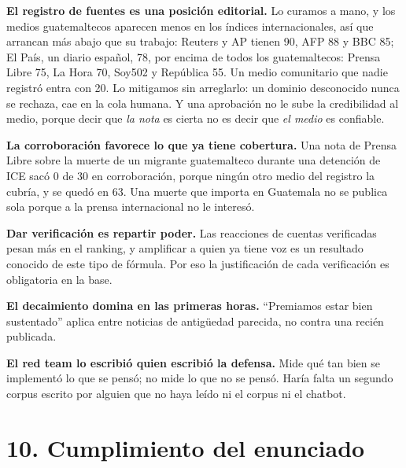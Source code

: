 \documentclass[12pt,a4paper]{article}
\begin{document}
\textbf{El registro de fuentes es una posición editorial.} Lo curamos a mano, y los medios
guatemaltecos aparecen menos en los índices internacionales, así que arrancan más abajo que su
trabajo: Reuters y AP tienen 90, AFP 88 y BBC 85; El País, un diario español, 78, por encima de
todos los guatemaltecos: Prensa Libre 75, La Hora 70, Soy502 y República 55. Un medio comunitario
que nadie registró entra con 20. Lo mitigamos sin arreglarlo: un dominio desconocido nunca se
rechaza, cae en la cola humana. Y una aprobación no le sube la credibilidad al medio, porque decir
que \emph{la nota} es cierta no es decir que \emph{el medio} es confiable.

\textbf{La corroboración favorece lo que ya tiene cobertura.} Una nota de Prensa Libre sobre la
muerte de un migrante guatemalteco durante una detención de ICE sacó 0 de 30 en corroboración,
porque ningún otro medio del registro la cubría, y se quedó en 63. Una muerte que importa en
Guatemala no se publica sola porque a la prensa internacional no le interesó.

\textbf{Dar verificación es repartir poder.} Las reacciones de cuentas verificadas pesan más en el
ranking, y amplificar a quien ya tiene voz es un resultado conocido de este tipo de fórmula. Por eso
la justificación de cada verificación es obligatoria en la base.

\textbf{El decaimiento domina en las primeras horas.} ``Premiamos estar bien sustentado'' aplica
entre noticias de antigüedad parecida, no contra una recién publicada.

\textbf{El red team lo escribió quien escribió la defensa.} Mide qué tan bien se implementó lo que
se pensó; no mide lo que no se pensó. Haría falta un segundo corpus escrito por alguien que no haya
leído ni el corpus ni el chatbot.

\section{10. Cumplimiento del enunciado}
\end{document}
